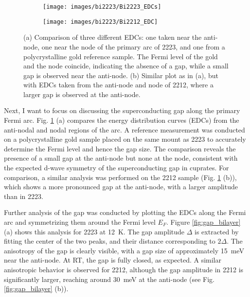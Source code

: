 \begin{figure}[t]
	\centering
	\begin{subfigure}[b]{0.49\textwidth}
		\texttt{[image: images/bi2223/Bi2223\_EDCs]}
		\caption{}
	\end{subfigure}
	\begin{subfigure}[b]{0.49\textwidth}
		\texttt{[image: images/bi2223/Bi2212\_EDC]}
		\caption{}
	\end{subfigure}
	\caption{(a) Comparison of three different EDCs: one taken near the anti-node, one near the node of the primary arc of 2223, and one from a polycrystalline gold reference sample. The Fermi level of the gold and the node coincide, indicating the absence of a gap, while a small gap is observed near the anti-node. (b) Similar plot as in (a), but with EDCs taken from the anti-node and node of 2212, where a larger gap is observed at the anti-node.}
	\label{fig:edc_comparison}
\end{figure}

Next, I want to focus on discussing the superconducting gap along the primary Fermi arc.
Fig. \ref{fig:edc_comparison} (a) compares the energy distribution curves (EDCs) from the anti-nodal and nodal regions of the arc.
A reference measurement was conducted on a polycrystalline gold sample placed on the same mount as 2223 to accurately determine the Fermi level and hence the gap size.
The comparison reveals the presence of a small gap at the anti-node but none at the node, consistent with the expected d-wave symmetry of the superconducting gap in cuprates.
For comparison, a similar analysis was performed on the 2212 sample (Fig. \ref{fig:edc_comparison} (b)), which shows a more pronounced gap at the anti-node, with a larger amplitude than in 2223.

Further analysis of the gap was conducted by plotting the EDCs along the Fermi arc and symmetrizing them around the Fermi level $E_F$.
Figure \ref{fig:gap_bilayer} (a) shows this analysis for 2223 at \qty{12}{\kelvin}.
The gap amplitude $\Delta$ is extracted by fitting the center of the two peaks, and their distance corresponding to $2\Delta$.
The anisotropy of the gap is clearly visible, with a gap size of approximately \qty{15}{\milli\electronvolt} near the anti-node.
At RT, the gap is fully closed, as expected.
A similar anisotropic behavior is observed for 2212, although the gap amplitude in 2212 is significantly larger, reaching around \qty{30}{\milli\electronvolt} at the anti-node (see Fig. \ref{fig:gap_bilayer} (b)).

